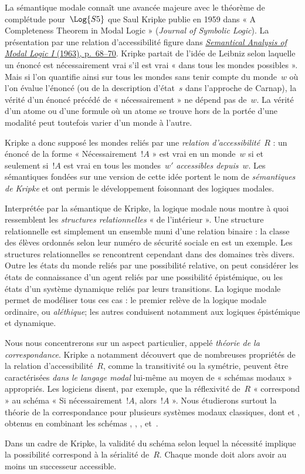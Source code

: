 \documentclass[../../../include/open-logic-section]{subfiles}
\begin{document}
La sémantique modale connaît une avancée majeure avec le théorème de
complétude pour~$\Log{S5}$ que Saul Kripke publie en 1959 dans
« A Completeness Theorem in Modal Logic » (\emph{Journal of Symbolic Logic}).
La présentation par une relation d'accessibilité figure dans
\href{https://doi.org/10.1002/malq.19630090502}{\emph{Semantical Analysis of Modal Logic I} (1963), p.~68--70}.
Kripke partait de l'idée de Leibniz selon laquelle un énoncé est
nécessairement vrai s'il est vrai « dans tous les mondes possibles ».
Mais si l'on quantifie ainsi sur tous les mondes sans tenir compte
du monde~$w$ où l'on évalue l'énoncé (ou de la description
d'état~$s$ dans l'approche de Carnap), la vérité d'un énoncé précédé
de « nécessairement » ne dépend pas de~$w$. La vérité d'un atome ou
d'une formule où un atome se trouve hors de la portée d'une modalité
peut toutefois varier d'un monde à l'autre.

Kripke a donc supposé les mondes reliés par une \emph{relation d'accessibilité}~$R$ : un
énoncé de la forme « Nécessairement~$!A$ » est vrai en un monde~$w$
si et seulement si~$!A$ est vrai en tous les mondes~$w'$
\emph{accessibles depuis}~$w$. Les sémantiques fondées sur une
version de cette idée portent le nom de \emph{sémantiques de Kripke}
et ont permis le développement foisonnant des logiques modales.

Interprétée par la sémantique de Kripke, la logique modale nous
montre à quoi ressemblent les \emph{structures relationnelles}
« de l'intérieur ». Une structure relationnelle est simplement un
ensemble muni d'une relation binaire : la classe des élèves ordonnés
selon leur numéro de sécurité sociale en est un exemple. Les
structures relationnelles se rencontrent cependant dans des
domaines très divers. Outre les états du monde reliés par une
possibilité relative, on peut considérer les états de connaissance
d'un agent reliés par une possibilité épistémique, ou les états d'un
système dynamique reliés par leurs transitions. La logique modale
permet de modéliser tous ces cas : le premier relève de la logique
modale ordinaire, ou \emph{aléthique}; les autres conduisent
notamment aux logiques épistémique et dynamique.

Nous nous concentrerons sur un aspect particulier, appelé
\emph{théorie de la correspondance}. Kripke a notamment découvert
que de nombreuses propriétés de la relation d'accessibilité~$R$,
comme la transitivité ou la symétrie, peuvent être caractérisées
\emph{dans le langage modal} lui-même au moyen de « schémas
modaux » appropriés. Les logiciens disent, par exemple, que la
réflexivité de~$R$ « correspond » au schéma « Si nécessairement~$!A$,
alors~$!A$ ». Nous étudierons surtout la théorie de la
correspondance pour plusieurs systèmes modaux classiques, dont
 et , obtenus en combinant les schémas
, , ,  et~.

Dans un cadre de Kripke, la validité du schéma selon lequel la
nécessité implique la possibilité correspond à la sérialité de~$R$.
Chaque monde doit alors avoir au moins un successeur accessible.
\end{document}
